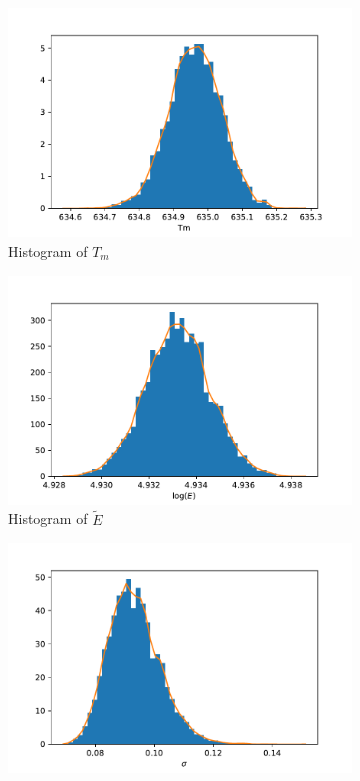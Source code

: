 \begin{figure}[h!]
\centering
\begin{subfigure}{0.5\textwidth}
\centering
\includegraphics[width=\linewidth]{figures/bayesian/Tm/hist_Tm.pdf}
\caption{Histogram of $T_m$}
\label{HistTm}
\end{subfigure}%
\begin{subfigure}{0.5\textwidth}
\centering
\includegraphics[width=\linewidth]{figures/bayesian/Tm/hist_E.pdf}
\caption{Histogram of $\tilde{E}$}
\label{HistTE}
\end{subfigure}
\newline
\begin{subfigure}{0.5\textwidth}
\centering
\includegraphics[width=\linewidth]{figures/bayesian/Tm/hist_sigma.pdf}

\end{subfigure}
\end{figure}
